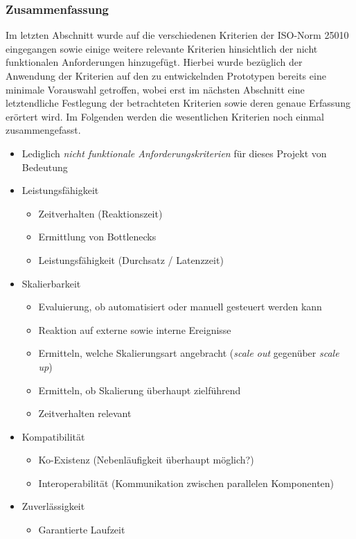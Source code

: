\subsubsection{Zusammenfassung}
Im letzten Abschnitt wurde auf die verschiedenen Kriterien der ISO-Norm 25010 eingegangen sowie einige weitere relevante Kriterien hinsichtlich der nicht funktionalen Anforderungen hinzugefügt. Hierbei wurde bezüglich der Anwendung der Kriterien auf den zu entwickelnden Prototypen bereits eine minimale Vorauswahl getroffen, wobei erst im nächsten Abschnitt eine letztendliche Festlegung der betrachteten Kriterien sowie deren genaue Erfassung erörtert wird. Im Folgenden werden die wesentlichen Kriterien noch einmal zusammengefasst.

\begin{itemize}
	\item Lediglich \emph{nicht funktionale Anforderungskriterien} für dieses Projekt von Bedeutung
	\item Leistungsfähigkeit
	\begin{itemize}
		\item Zeitverhalten (Reaktionszeit)
		\item Ermittlung von Bottlenecks
		\item Leistungsfähigkeit (Durchsatz / Latenzzeit)
	\end{itemize}
	\item Skalierbarkeit
	\begin{itemize}
		\item Evaluierung, ob automatisiert oder manuell gesteuert werden kann
		\item Reaktion auf externe sowie interne Ereignisse
		\item Ermitteln, welche Skalierungsart angebracht (\emph{scale out} gegenüber \emph{scale up})
		\item Ermitteln, ob Skalierung überhaupt zielführend
		\item Zeitverhalten relevant
	\end{itemize}
	\item Kompatibilität
	\begin{itemize}
		\item Ko-Existenz (Nebenläufigkeit überhaupt möglich?)
		\item Interoperabilität (Kommunikation zwischen parallelen Komponenten)
	\end{itemize}
	\item Zuverlässigkeit
	\begin{itemize}
		\item Garantierte Laufzeit

\end{itemize}
\end{itemize}
